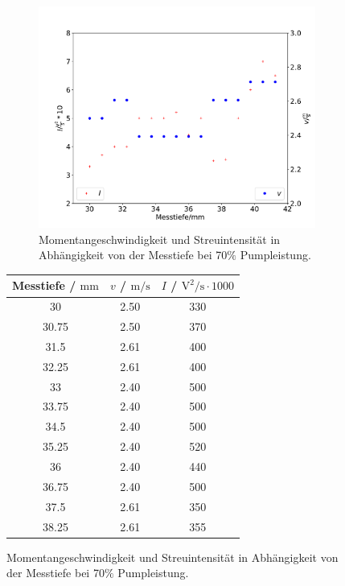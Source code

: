       \begin{figure}
        \begin{subfigure}{0.6\textwidth}
        \centering
        \includegraphics[width=\textwidth]{b70.pdf}
        \caption{Momentangeschwindigkeit und Streuintensität in Abhängigkeit von der Messtiefe
        bei 70$\%$ Pumpleistung.}
        \label{fig:5}
        \qquad
      \end{subfigure}
      \begin{subtable}{0.4\textwidth}
        \centering
        \begin{tabular}{c c c}
          \toprule
          Messtiefe / $\si{\meter\meter}$ & $v$ / $\si{\meter\per\second}$ & $I$ / $\si{\volt\squared\per\second} \cdot 1000$ \\
          \midrule
          30 & 2.50 & 330 \\
          30.75 & 2.50 & 370 \\
          31.5 & 2.61 & 400 \\
          32.25 & 2.61 & 400 \\
          33 & 2.40 & 500 \\
          33.75 & 2.40 & 500 \\
          34.5 & 2.40 & 500 \\
          35.25 & 2.40 & 520 \\
          36 & 2.40 & 440 \\
          36.75 & 2.40 & 500 \\
          37.5 & 2.61 & 350 \\
          38.25 & 2.61 & 355 \\

\end{tabular}
\end{subtable}
\end{figure}
